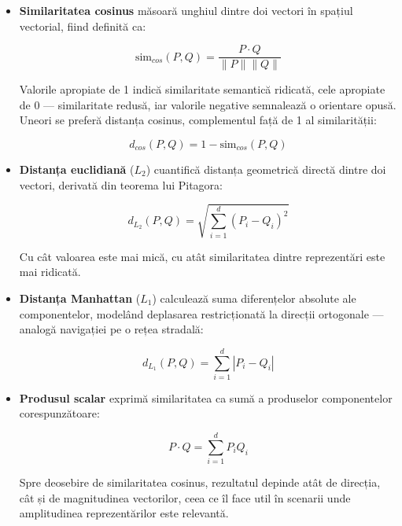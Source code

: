 \documentclass[12pt, a4paper, oneside, romanian]{teza-upb}
\begin{document}
\begin{itemize}
    \item \textbf{Similaritatea cosinus} măsoară unghiul dintre doi vectori în spațiul vectorial, fiind definită ca:

\begin{equation}
\text{sim}_{cos}(P, Q) = \frac{P \cdot Q}{\|P\| \|Q\|}
\end{equation}

Valorile apropiate de 1 indică similaritate semantică ridicată, cele apropiate de 0 — similaritate redusă, iar valorile negative semnalează o orientare opusă. Uneori se preferă distanța cosinus, complementul față de 1 al similarității:

\begin{equation}
d_{cos}(P, Q) = 1 - \text{sim}_{cos}(P, Q)
\end{equation}

    \item \textbf{Distanța euclidiană} ($L_2$) cuantifică distanța geometrică directă dintre doi vectori, derivată din teorema lui Pitagora:

\begin{equation}
d_{L_2}(P, Q) = \sqrt{\sum_{i=1}^{d} (P_i - Q_i)^2}
\end{equation}

Cu cât valoarea este mai mică, cu atât similaritatea dintre reprezentări este mai ridicată.

    \item \textbf{Distanța Manhattan} ($L_1$) calculează suma diferențelor absolute ale componentelor, modelând deplasarea restricționată la direcții ortogonale — analogă navigației pe o rețea stradală:

\begin{equation}
d_{L_1}(P, Q) = \sum_{i=1}^{d} |P_i - Q_i|
\end{equation}

    \item \textbf{Produsul scalar} exprimă similaritatea ca sumă a produselor componentelor corespunzătoare:

\begin{equation}
P \cdot Q = \sum_{i=1}^{d} P_i Q_i
\end{equation}

Spre deosebire de similaritatea cosinus, rezultatul depinde atât de direcția, cât și de magnitudinea vectorilor, ceea ce îl face util în scenarii unde amplitudinea reprezentărilor este relevantă. \cite{levy2024similarity}

\end{itemize}
\end{document}

